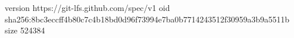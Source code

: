 version https://git-lfs.github.com/spec/v1
oid sha256:8bc3eccff4b80c7c4b18bd0d96f73994e7ba0b7714243512f30959a3b9a5511b
size 524384
